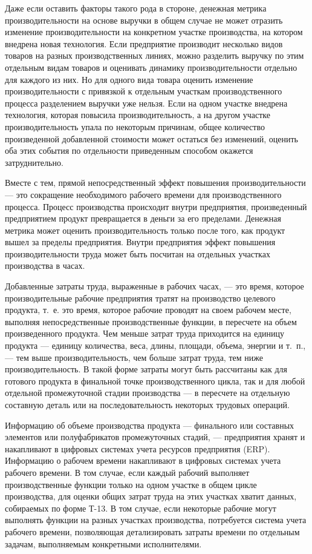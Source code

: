 \documentclass{article}
\begin{document}
Даже если оставить факторы такого рода в стороне, денежная метрика производительности на основе выручки в общем случае не может отразить изменение производительности на конкретном участке производства, на котором внедрена новая технология. Если предприятие производит несколько видов товаров на разных производственных линиях, можно разделить выручку по этим отдельным видам товаров и оценивать динамику производительности отдельно для каждого из них. Но для одного вида товара оценить изменение производительности с привязкой к отдельным участкам производственного процесса разделением выручки уже нельзя. Если на одном участке внедрена технология, которая повысила производительность, а на другом участке производительность упала по некоторым причинам, общее количество произведенной добавленной стоимости может остаться без изменений, оценить оба этих события по отдельности приведенным способом окажется затруднительно.

Вместе с тем, прямой непосредственный эффект повышения производительности — это сокращение необходимого рабочего времени для производственного процесса. Процесс производства происходит внутри предприятия, произведенный предприятием продукт превращается в деньги за его пределами. Денежная метрика может оценить производительность только после того, как продукт вышел за пределы предприятия. Внутри предприятия эффект повышения производительности труда может быть посчитан на отдельных участках производства в часах.

Добавленные затраты труда, выраженные в рабочих часах, — это время, которое производительные рабочие предприятия тратят на производство целевого продукта, т.~е. это время, которое рабочие проводят на своем рабочем месте, выполняя непосредственные производственные функции, в пересчете на объем произведенного продукта. Чем меньше затрат труда приходится на единицу продукта — единицу количества, веса, длины, площади, объема, энергии и т.~п., — тем выше производительность, чем больше затрат труда, тем ниже производительность. В такой форме затраты могут быть рассчитаны как для готового продукта в финальной точке производственного цикла, так и для любой отдельной промежуточной стадии производства — в пересчете на отдельную составную деталь или на последовательность некоторых трудовых операций.

Информацию об объеме производства продукта — финального или составных элементов или полуфабрикатов промежуточных стадий, — предприятия хранят и накапливают в цифровых системах учета ресурсов предприятия (ERP). Информацию о рабочем времени накапливают в цифровых системах учета рабочего времени. В том случае, если каждый рабочий выполняет производственные функции только на одном участке в общем цикле производства, для оценки общих затрат труда на этих участках хватит данных, собираемых по форме Т-13. В том случае, если некоторые рабочие могут выполнять функции на разных участках производства, потребуется система учета рабочего времени, позволяющая детализировать затраты времени по отдельным задачам, выполняемым конкретными исполнителями.
\end{document}
